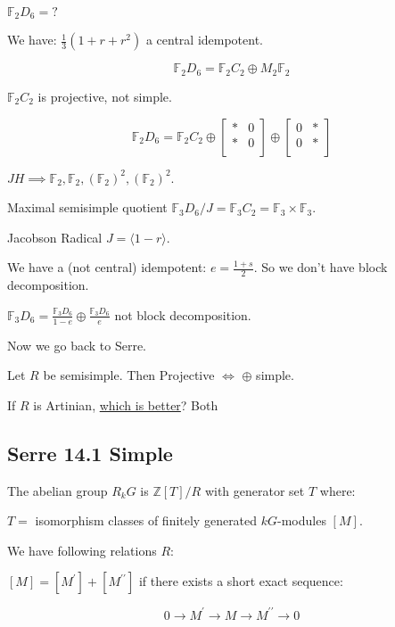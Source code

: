 \documentclass{article}
\theoremstyle{definition}
\begin{document}
\(\mathbb{F}_2 D_6 = ?\) 

We have: \(\frac{1}{3}(1 + r + r^2)\) a central idempotent.

\[
    \mathbb{F}_2 D_6 = \mathbb{F}_2 C_2 \oplus M_2 \mathbb{F}_2
\]

\(\mathbb{F}_2 C_2\) is projective, not simple.

\[
    \mathbb{F}_2 D_6 = \mathbb{F}_2 C_2 \oplus \begin{bmatrix}
        \ast &  0 \\
        \ast &  0 \\
    \end{bmatrix} \oplus \begin{bmatrix}
        0 &  \ast \\
        0 &  \ast \\
    \end{bmatrix}
\]

\(JH \implies \mathbb{F}_2, \mathbb{F}_2, (\mathbb{F}_2)^2, (\mathbb{F}_2)^2\).

Maximal semisimple quotient \(\mathbb{F}_3 D_6 / J = \mathbb{F}_3 C_2 = \mathbb{F}_3 \times \mathbb{F}_3\).

Jacobson Radical \(J = \langle 1-r \rangle\).

We have a (not central) idempotent: \(e = \frac{1 + s}{2}\). So we don't have block decomposition.

\(\mathbb{F}_3 D_6 = \frac{\mathbb{F}_3 D_6}{1-e} \oplus \frac{\mathbb{F}_3 D_6}{e}\) not block decomposition.

Now we go back to Serre.

Let \(R\) be semisimple. Then Projective \(\iff\) \(\oplus\) simple.

If \(R\) is Artinian, \underline{which is better}? Both

\subsection*{Serre 14.1 Simple}

The abelian group \(R_k G\) is \(\mathbb{Z}[T] / R\) with generator set \(T\) where:

\(T =\) isomorphism classes of finitely generated \(kG\)-modules \([M]\).

We have following relations \(R\):

\([M] = [M^{\prime}] + [M^{\prime\prime}]\) if there exists a short exact sequence:

\[
    0 \to M^{\prime} \to M \to M^{\prime\prime} \to 0
\]
\end{document}
